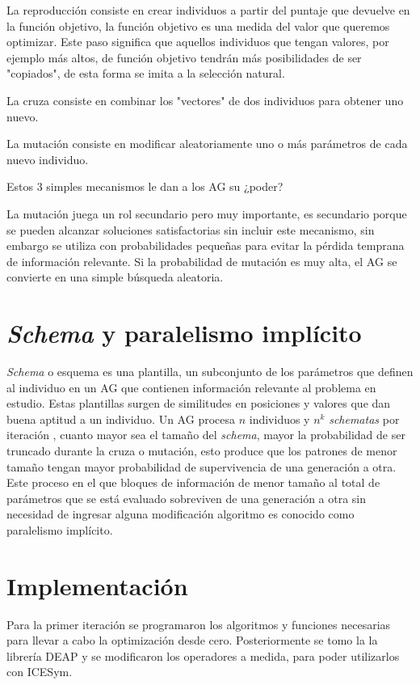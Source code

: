 La reproducción consiste en crear individuos a partir del puntaje que devuelve
en la función objetivo, la función objetivo es una medida del valor que
queremos optimizar.
%
Este paso significa que aquellos individuos que tengan valores, por ejemplo más
altos, de función objetivo tendrán más posibilidades de ser "copiados", de esta
forma se imita a la selección natural.

La cruza consiste en combinar los "vectores" de dos individuos para obtener uno
nuevo.

La mutación consiste en modificar aleatoriamente uno o más parámetros de cada
nuevo individuo.

Estos 3 simples mecanismos le dan a los AG su ¿poder?

La mutación juega un rol secundario pero muy importante, es secundario porque
se pueden alcanzar soluciones satisfactorias sin incluir este mecanismo, sin
embargo se utiliza con probabilidades pequeñas para evitar la pérdida temprana
de información relevante.
%
Si la probabilidad de mutación es muy alta, el AG se convierte en una simple
búsqueda aleatoria.

\section{\emph{Schema} y paralelismo implícito}

\emph{Schema} o esquema es una plantilla, un subconjunto de los parámetros que
definen al individuo en un AG que contienen información relevante al problema
en estudio.
%
Estas plantillas surgen de similitudes en posiciones y valores que dan buena
aptitud a un individuo.
%
Un AG procesa $n$ individuos y $n^k$ \emph{schematas} por iteración
\cite{goldberg}, cuanto mayor sea el tamaño del \emph{schema}, mayor la
probabilidad de ser truncado durante la cruza o mutación, esto produce que los
patrones de menor tamaño tengan mayor probabilidad de supervivencia de una
generación a otra.
%
Este proceso en el que bloques de información de menor tamaño al total de
parámetros que se está evaluado sobreviven de una generación a otra sin
necesidad de ingresar alguna modificación algoritmo es conocido como paralelismo
implícito.

\section{Implementación}
%
Para la primer iteración se programaron los algoritmos y funciones necesarias
para llevar a cabo la optimización desde cero.
%
Posteriormente se tomo la la librería DEAP \cite{DEAP_JMLR2012} y se
modificaron los operadores a medida, para poder utilizarlos con ICESym.

